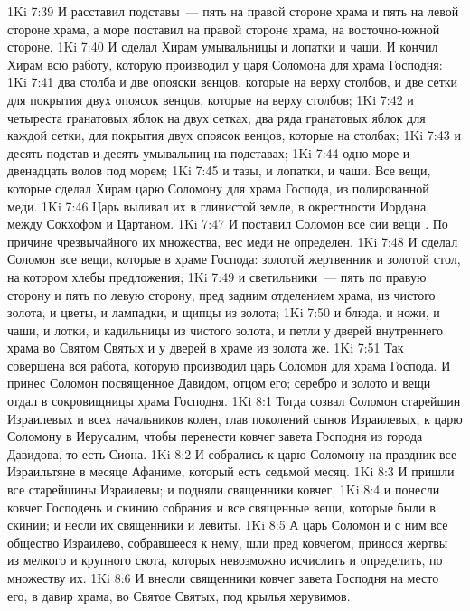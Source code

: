 \vs 1Ki 7:39 И расставил подставы~--- пять на правой стороне храма и пять на левой стороне храма, а море поставил на правой стороне храма, на восточно-южной стороне.
\vs 1Ki 7:40 И сделал Хирам умывальницы и лопатки и чаши. И кончил Хирам всю работу, которую производил у царя Соломона для храма Господня:
\vs 1Ki 7:41 два столба и две опояски венцов, которые на верху столбов, и две сетки для покрытия двух опоясок венцов, которые на верху столбов;
\vs 1Ki 7:42 и четыреста гранатовых яблок на двух сетках; два ряда гранатовых яблок для каждой сетки, для покрытия двух опоясок венцов, которые на столбах;
\vs 1Ki 7:43 и десять подстав и десять умывальниц на подставах;
\vs 1Ki 7:44 одно море и двенадцать волов под морем;
\vs 1Ki 7:45 и тазы, и лопатки, и чаши. Все вещи, которые сделал Хирам царю Соломону для храма Господа,  из полированной меди.
\vs 1Ki 7:46 Царь выливал их в глинистой земле, в окрестности Иордана, между Сокхофом и Цартаном.
\vs 1Ki 7:47 И поставил Соломон все сии вещи . По причине чрезвычайного их множества, вес меди не определен.
\rsbpar\vs 1Ki 7:48 И сделал Соломон все вещи, которые в храме Господа: золотой жертвенник и золотой стол, на котором хлебы предложения;
\vs 1Ki 7:49 и светильники~--- пять по правую сторону и пять по левую сторону, пред задним отделением храма, из чистого золота, и цветы, и лампадки, и щипцы из золота;
\vs 1Ki 7:50 и блюда, и ножи, и чаши, и лотки, и кадильницы из чистого золота, и петли у дверей внутреннего храма во Святом Святых и у дверей в храме из золота же.
\vs 1Ki 7:51 Так совершена вся работа, которую производил царь Соломон для храма Господа. И принес Соломон посвященное Давидом, отцом его; серебро и золото и вещи отдал в сокровищницы храма Господня.
\vs 1Ki 8:1 Тогда созвал Соломон старейшин Израилевых и всех начальников колен, глав поколений сынов Израилевых, к царю Соломону в Иерусалим, чтобы перенести ковчег завета Господня из города Давидова, то есть Сиона.
\vs 1Ki 8:2 И собрались к царю Соломону на праздник все Израильтяне в месяце Афаниме, который есть седьмой месяц.
\vs 1Ki 8:3 И пришли все старейшины Израилевы; и подняли священники ковчег,
\vs 1Ki 8:4 и понесли ковчег Господень и скинию собрания и все священные вещи, которые были в скинии; и несли их священники и левиты.
\vs 1Ki 8:5 А царь Соломон и с ним все общество Израилево, собравшееся к нему, шли пред ковчегом, принося жертвы из мелкого и крупного скота, которых невозможно исчислить и определить, по множеству их.
\vs 1Ki 8:6 И внесли священники ковчег завета Господня на место его, в давир храма, во Святое Святых, под крылья херувимов.
